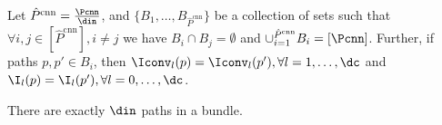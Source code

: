 \begin{definition}\label{def:bundle}
Let $\hat{P}^{\text{cnn}}=\frac{\Pcnn}{\din}$, and $\{B_1,\ldots, B_{\hat{P}^{\text{cnn}}}\}$ be a collection of sets such that $\forall i,j\in [\hat{P}^{\text{cnn}}], i\neq j$ we have $B_i\cap B_j=\emptyset$ and $\cup_{i=1}^{\hat{P}^{\text{cnn}}}B_i =[\Pcnn]$. Further,  if paths $p,p' \in B_i$, then $\Iconv_l(p)=\Iconv_l(p'), \forall l=1,\ldots, \dc$ and $\I_l(p)=\I_l(p'), \forall l=0,\ldots, \dc$.
\end{definition}
\begin{proposition}\label{prop:bundle}
There are exactly $\din$ paths in a bundle.
\end{proposition}

